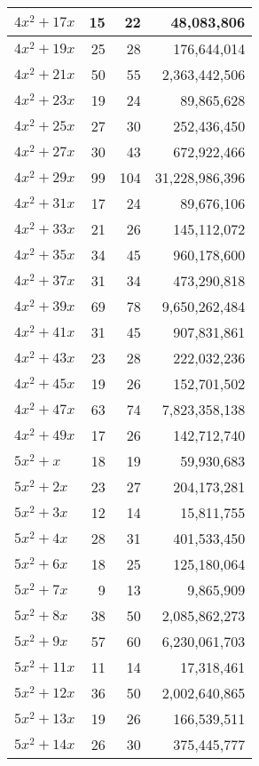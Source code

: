\documentclass[a4paper]{amsproc}
\theoremstyle{plain}
\theoremstyle{named}
\begin{document}
\begin{longtable}{ | l | r | r | r | }
$4x^2 + 17x$ & 15 & 22 & 48{,}083{,}806 \\ \hline
$4x^2 + 19x$ & 25 & 28 & 176{,}644{,}014 \\ \hline
$4x^2 + 21x$ & 50 & 55 & 2{,}363{,}442{,}506 \\ \hline
$4x^2 + 23x$ & 19 & 24 & 89{,}865{,}628 \\ \hline
$4x^2 + 25x$ & 27 & 30 & 252{,}436{,}450 \\ \hline
$4x^2 + 27x$ & 30 & 43 & 672{,}922{,}466 \\ \hline
$4x^2 + 29x$ & 99 & 104 & 31{,}228{,}986{,}396 \\ \hline
$4x^2 + 31x$ & 17 & 24 & 89{,}676{,}106 \\ \hline
$4x^2 + 33x$ & 21 & 26 & 145{,}112{,}072 \\ \hline
$4x^2 + 35x$ & 34 & 45 & 960{,}178{,}600 \\ \hline
$4x^2 + 37x$ & 31 & 34 & 473{,}290{,}818 \\ \hline
$4x^2 + 39x$ & 69 & 78 & 9{,}650{,}262{,}484 \\ \hline
$4x^2 + 41x$ & 31 & 45 & 907{,}831{,}861 \\ \hline
$4x^2 + 43x$ & 23 & 28 & 222{,}032{,}236 \\ \hline
$4x^2 + 45x$ & 19 & 26 & 152{,}701{,}502 \\ \hline
$4x^2 + 47x$ & 63 & 74 & 7{,}823{,}358{,}138 \\ \hline
$4x^2 + 49x$ & 17 & 26 & 142{,}712{,}740 \\ \hline
$5x^2 + x$ & 18 & 19 & 59{,}930{,}683 \\ \hline
$5x^2 + 2x$ & 23 & 27 & 204{,}173{,}281 \\ \hline
$5x^2 + 3x$ & 12 & 14 & 15{,}811{,}755 \\ \hline
$5x^2 + 4x$ & 28 & 31 & 401{,}533{,}450 \\ \hline
$5x^2 + 6x$ & 18 & 25 & 125{,}180{,}064 \\ \hline
$5x^2 + 7x$ & 9 & 13 & 9{,}865{,}909 \\ \hline
$5x^2 + 8x$ & 38 & 50 & 2{,}085{,}862{,}273 \\ \hline
$5x^2 + 9x$ & 57 & 60 & 6{,}230{,}061{,}703 \\ \hline
$5x^2 + 11x$ & 11 & 14 & 17{,}318{,}461 \\ \hline
$5x^2 + 12x$ & 36 & 50 & 2{,}002{,}640{,}865 \\ \hline
$5x^2 + 13x$ & 19 & 26 & 166{,}539{,}511 \\ \hline
$5x^2 + 14x$ & 26 & 30 & 375{,}445{,}777 \\ \hline

\end{longtable}
\end{document}
